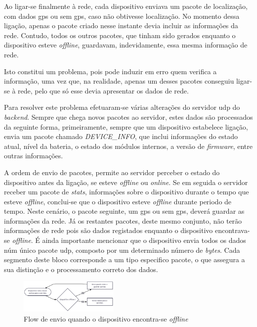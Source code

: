 Ao ligar-se finalmente à rede, cada dispositivo enviava um pacote de localização, com dados \acs{gps} ou sem \acs{gps}, caso não obtivesse localização. No momento dessa ligação, apenas o pacote criado nesse instante devia incluir as informações da rede. Contudo, todos os outros pacotes, que tinham sido gerados enquanto o dispositivo esteve \textit{offline}, guardavam, indevidamente, essa mesma informação de rede.

Isto constitui um problema, pois pode induzir em erro quem verifica a informação, uma vez que, na realidade, apenas um desses pacotes conseguiu ligar-se à rede, pelo que só esse devia apresentar os dados de rede.

Para resolver este problema efetuaram-se várias alterações do servidor \acs{udp} do \textit{backend}. Sempre que chega novos pacotes ao servidor, estes dados são processados da seguinte forma, primeiramente, sempre que um dispositivo estabelece ligação, envia um pacote chamado \textit{DEVICE\_INFO}, que inclui informações do estado atual, nível da bateria, o estado dos módulos internos, a versão de \textit{firmware}, entre outras informações. 

A ordem de envio de pacotes, permite ao servidor perceber o estado do dispositivo antes da ligação, se esteve \textit{offline} ou \textit{online}. Se em seguida o servidor receber um pacote de \textit{stats}, informações sobre o dispositivo durante o tempo que esteve \textit{offline}, conclui-se que o dispositivo esteve \textit{offline} durante periodo de tempo. Neste cenário, o pacote seguinte, um \acs{gps} ou sem \acs{gps}, deverá guardar as informações da rede. Já os restantes pacotes, deste mesmo conjunto, não terão informações de rede pois são dados registados enquanto o dispositivo encontrava-se \textit{offline}. É ainda importante mencionar que o dispositivo envia todos os dados núm único pacote \acs{udp}, composto por um determinado número de \textit{bytes}. Cada segmento deste bloco corresponde a um tipo especifico pacote, o que assegura a sua distinção e o processamento correto dos dados.

\begin{figure}[!h]
	\centering
	\includegraphics[width=0.43\textwidth]{figs/flowOffline.png}
	\caption{Flow de envio quando o dispositivo encontra-se \textit{offline}}
	\label{fig:flowOffline}
\end{figure}